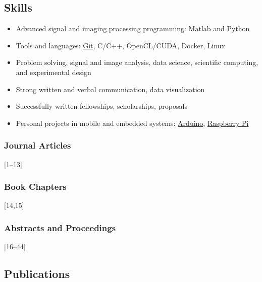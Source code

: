 \documentclass[
]{article}
\providecommand{\tightlist}{%
  \setlength{\itemsep}{0pt}\setlength{\parskip}{0pt}}
\begin{document}
\hypertarget{skills}{%
\subsection{Skills}\label{skills}}

\begin{itemize}
\tightlist
\item
  Advanced signal and imaging processing programming: Matlab and Python
\item
  Tools and languages: \href{http://git-scm.com/}{Git}, C/C++,
  OpenCL/CUDA, Docker, Linux
\item
  Problem solving, signal and image analysis, data science, scientific
  computing, and experimental design
\item
  Strong written and verbal communication, data visualization
\item
  Successfully written fellowships, scholarships, proposals
\item
  Personal projects in mobile and embedded systems:
  \href{http://www.arduino.cc/}{Arduino},
  \href{http://www.raspberrypi.org/}{Raspberry Pi}
\end{itemize}

\hypertarget{journal-articles}{%
\subsubsection{Journal Articles}\label{journal-articles}}

{[}1--13{]}

\hypertarget{book-chapters}{%
\subsubsection{Book Chapters}\label{book-chapters}}

{[}14,15{]}

\hypertarget{abstracts-and-proceedings}{%
\subsubsection{Abstracts and
Proceedings}\label{abstracts-and-proceedings}}

{[}16--44{]}

\hypertarget{publications}{%
\subsection*{Publications}\label{publications}}
\end{document}
